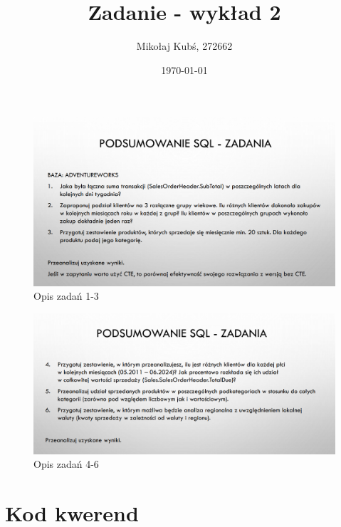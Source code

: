 \documentclass[a4paper,12pt]{article}
\title{Zadanie - wykład 2}
\author{Mikołaj Kubś, 272662}
\date{\today}
\begin{document}
\maketitle

\begin{figure}[H]
  \centering
  \includegraphics[width=1\textwidth]{images/task1.png}
  \caption{Opis zadań 1-3}
\end{figure}

\begin{figure}[H]
  \centering
  \includegraphics[width=1\textwidth]{images/task2.png}
  \caption{Opis zadań 4-6}
\end{figure}

\section{Kod kwerend}
\end{document}
